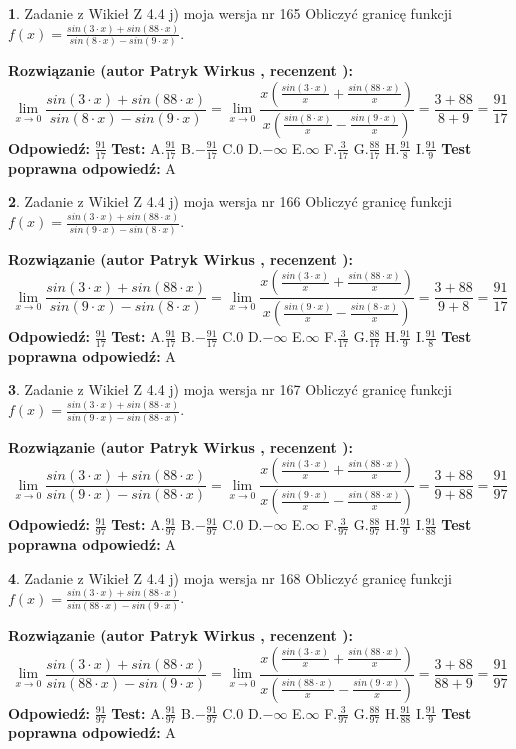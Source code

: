 \documentclass[12pt, a4paper]{article}
\theoremstyle{definition} %
\newtheorem{zad}{}
\newcommand{\zadStart}[1]{\begin{zad}#1\newline}
\newcommand{\zadStop}{\end{zad}}
\newcommand{\rozwStart}[2]{\noindent \textbf{Rozwiązanie (autor #1 , recenzent #2): }\newline}
\newcommand{\rozwStop}{\newline}
\newcommand{\odpStart}{\noindent \textbf{Odpowiedź:}\newline}
\newcommand{\odpStop}{\newline}
\newcommand{\testStart}{\noindent \textbf{Test:}\newline}
\newcommand{\testStop}{\newline}
\newcommand{\kluczStart}{\noindent \textbf{Test poprawna odpowiedź:}\newline}
\newcommand{\kluczStop}{\newline}
\begin{document}
\zadStart{Zadanie z Wikieł Z 4.4 j) moja wersja nr 165}
Obliczyć granicę funkcji $f(x)=\frac{sin(3\cdot x) +sin(88\cdot x)}{sin(8\cdot x) -sin(9\cdot x)}$.
\zadStop
\rozwStart{Patryk Wirkus}{}
$$\lim\limits_{x\to 0}\frac{sin(3\cdot x) +sin(88\cdot x)}{sin(8\cdot x) -sin(9\cdot x)}=\lim\limits_{x\to 0}\frac{x(\frac{sin(3\cdot x)}{x}+\frac{sin(88\cdot x)}{x})}{x(\frac{sin(8\cdot x)}{x}-\frac{sin(9\cdot x)}{x})}=\frac{3+88}{8+9} = \frac{91}{17}$$
\rozwStop
\odpStart
$\frac{91}{17}$
\odpStop
\testStart
A.$\frac{91}{17}$
B.$-\frac{91}{17}$
C.$0$
D.$-\infty$
E.$\infty$
F.$\frac{3}{17}$
G.$\frac{88}{17}$
H.$\frac{91}{8}$
I.$\frac{91}{9}$
\testStop
\kluczStart
A
\kluczStop



\zadStart{Zadanie z Wikieł Z 4.4 j) moja wersja nr 166}
Obliczyć granicę funkcji $f(x)=\frac{sin(3\cdot x) +sin(88\cdot x)}{sin(9\cdot x) -sin(8\cdot x)}$.
\zadStop
\rozwStart{Patryk Wirkus}{}
$$\lim\limits_{x\to 0}\frac{sin(3\cdot x) +sin(88\cdot x)}{sin(9\cdot x) -sin(8\cdot x)}=\lim\limits_{x\to 0}\frac{x(\frac{sin(3\cdot x)}{x}+\frac{sin(88\cdot x)}{x})}{x(\frac{sin(9\cdot x)}{x}-\frac{sin(8\cdot x)}{x})}=\frac{3+88}{9+8} = \frac{91}{17}$$
\rozwStop
\odpStart
$\frac{91}{17}$
\odpStop
\testStart
A.$\frac{91}{17}$
B.$-\frac{91}{17}$
C.$0$
D.$-\infty$
E.$\infty$
F.$\frac{3}{17}$
G.$\frac{88}{17}$
H.$\frac{91}{9}$
I.$\frac{91}{8}$
\testStop
\kluczStart
A
\kluczStop



\zadStart{Zadanie z Wikieł Z 4.4 j) moja wersja nr 167}
Obliczyć granicę funkcji $f(x)=\frac{sin(3\cdot x) +sin(88\cdot x)}{sin(9\cdot x) -sin(88\cdot x)}$.
\zadStop
\rozwStart{Patryk Wirkus}{}
$$\lim\limits_{x\to 0}\frac{sin(3\cdot x) +sin(88\cdot x)}{sin(9\cdot x) -sin(88\cdot x)}=\lim\limits_{x\to 0}\frac{x(\frac{sin(3\cdot x)}{x}+\frac{sin(88\cdot x)}{x})}{x(\frac{sin(9\cdot x)}{x}-\frac{sin(88\cdot x)}{x})}=\frac{3+88}{9+88} = \frac{91}{97}$$
\rozwStop
\odpStart
$\frac{91}{97}$
\odpStop
\testStart
A.$\frac{91}{97}$
B.$-\frac{91}{97}$
C.$0$
D.$-\infty$
E.$\infty$
F.$\frac{3}{97}$
G.$\frac{88}{97}$
H.$\frac{91}{9}$
I.$\frac{91}{88}$
\testStop
\kluczStart
A
\kluczStop



\zadStart{Zadanie z Wikieł Z 4.4 j) moja wersja nr 168}
Obliczyć granicę funkcji $f(x)=\frac{sin(3\cdot x) +sin(88\cdot x)}{sin(88\cdot x) -sin(9\cdot x)}$.
\zadStop
\rozwStart{Patryk Wirkus}{}
$$\lim\limits_{x\to 0}\frac{sin(3\cdot x) +sin(88\cdot x)}{sin(88\cdot x) -sin(9\cdot x)}=\lim\limits_{x\to 0}\frac{x(\frac{sin(3\cdot x)}{x}+\frac{sin(88\cdot x)}{x})}{x(\frac{sin(88\cdot x)}{x}-\frac{sin(9\cdot x)}{x})}=\frac{3+88}{88+9} = \frac{91}{97}$$
\rozwStop
\odpStart
$\frac{91}{97}$
\odpStop
\testStart
A.$\frac{91}{97}$
B.$-\frac{91}{97}$
C.$0$
D.$-\infty$
E.$\infty$
F.$\frac{3}{97}$
G.$\frac{88}{97}$
H.$\frac{91}{88}$
I.$\frac{91}{9}$
\testStop
\kluczStart
A
\kluczStop
\end{document}
